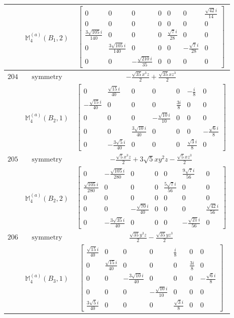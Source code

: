\documentclass[fleqn,8pt,landscape]{jsarticle}
\begin{document}
\begin{longtable}{ccc}
$  $ & $ \mathbb{M}_{4}^{(a)}(B_{1},2) $ & $ \begin{bmatrix} 0 & 0 & 0 & 0 & 0 & 0 & \frac{\sqrt{42} i}{14} \\ 0 & 0 & 0 & 0 & 0 & 0 & 0 \\ \frac{3 \sqrt{105} i}{140} & 0 & 0 & 0 & \frac{\sqrt{7} i}{28} & 0 & 0 \\ 0 & \frac{3 \sqrt{105} i}{140} & 0 & 0 & 0 & - \frac{\sqrt{7} i}{28} & 0 \\ 0 & 0 & - \frac{\sqrt{210} i}{35} & 0 & 0 & 0 & 0 \end{bmatrix} $ \\ \hline
$ 204 $ & $ \text{symmetry} $ & $ - \frac{\sqrt{35} x^{3} z}{2} + \frac{\sqrt{35} x z^{3}}{2} $ \\
$  $ & $ \mathbb{M}_{4}^{(a)}(B_{2},1) $ & $ \begin{bmatrix} 0 & \frac{\sqrt{15} i}{40} & 0 & 0 & 0 & - \frac{i}{8} & 0 \\ - \frac{\sqrt{15} i}{40} & 0 & 0 & 0 & \frac{3 i}{8} & 0 & 0 \\ 0 & 0 & 0 & - \frac{\sqrt{10} i}{10} & 0 & 0 & 0 \\ 0 & 0 & \frac{3 \sqrt{10} i}{40} & 0 & 0 & 0 & - \frac{\sqrt{6} i}{8} \\ 0 & - \frac{3 \sqrt{5} i}{40} & 0 & 0 & 0 & \frac{\sqrt{3} i}{8} & 0 \end{bmatrix} $ \\ \hline
$ 205 $ & $ \text{symmetry} $ & $ - \frac{\sqrt{5} x^{3} z}{2} + 3 \sqrt{5} x y^{2} z - \frac{\sqrt{5} x z^{3}}{2} $ \\
$  $ & $ \mathbb{M}_{4}^{(a)}(B_{2},2) $ & $ \begin{bmatrix} 0 & - \frac{\sqrt{105} i}{280} & 0 & 0 & 0 & \frac{9 \sqrt{7} i}{56} & 0 \\ \frac{\sqrt{105} i}{280} & 0 & 0 & 0 & \frac{5 \sqrt{7} i}{56} & 0 & 0 \\ 0 & 0 & 0 & 0 & 0 & 0 & 0 \\ 0 & 0 & - \frac{\sqrt{70} i}{40} & 0 & 0 & 0 & \frac{\sqrt{42} i}{56} \\ 0 & - \frac{3 \sqrt{35} i}{40} & 0 & 0 & 0 & - \frac{\sqrt{21} i}{56} & 0 \end{bmatrix} $ \\ \hline
$ 206 $ & $ \text{symmetry} $ & $ \frac{\sqrt{35} y^{3} z}{2} - \frac{\sqrt{35} y z^{3}}{2} $ \\
$  $ & $ \mathbb{M}_{4}^{(a)}(B_{3},1) $ & $ \begin{bmatrix} \frac{\sqrt{15} i}{40} & 0 & 0 & 0 & \frac{i}{8} & 0 & 0 \\ 0 & \frac{\sqrt{15} i}{40} & 0 & 0 & 0 & \frac{3 i}{8} & 0 \\ 0 & 0 & - \frac{3 \sqrt{10} i}{40} & 0 & 0 & 0 & - \frac{\sqrt{6} i}{8} \\ 0 & 0 & 0 & - \frac{\sqrt{10} i}{10} & 0 & 0 & 0 \\ \frac{3 \sqrt{5} i}{40} & 0 & 0 & 0 & \frac{\sqrt{3} i}{8} & 0 & 0 \end{bmatrix} $ \\ \hline

\end{longtable}
\end{document}
